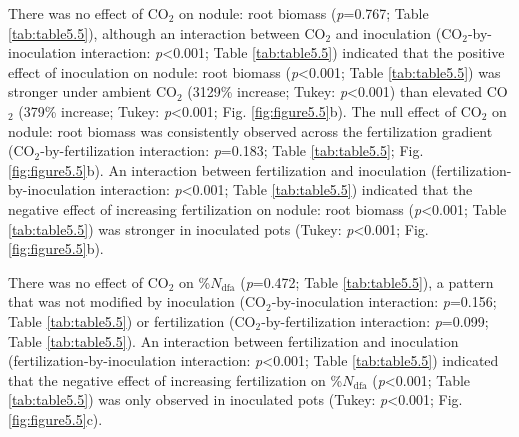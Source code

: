 There was no effect of CO$_2$ on nodule: root biomass (\textit{p}=0.767; Table \ref{tab:table5.5}), although an interaction between CO$_2$ and inoculation (CO$_2$-by-inoculation interaction: \textit{p}<0.001; Table \ref{tab:table5.5}) indicated that the positive effect of inoculation on nodule: root biomass (\textit{p}<0.001; Table \ref{tab:table5.5}) was stronger under ambient CO$_2$ (3129\% increase; Tukey: \textit{p}<0.001) than elevated CO$_2$ (379\% increase; Tukey: \textit{p}<0.001; Fig. \ref{fig:figure5.5}b). The null effect of CO$_2$ on nodule: root biomass was consistently observed across the fertilization gradient (CO$_2$-by-fertilization interaction: \textit{p}=0.183; Table \ref{tab:table5.5}; Fig. \ref{fig:figure5.5}b). An interaction between fertilization and inoculation (fertilization-by-inoculation interaction: \textit{p}<0.001; Table \ref{tab:table5.5}) indicated that the negative effect of increasing fertilization on nodule: root biomass (\textit{p}<0.001; Table \ref{tab:table5.5}) was stronger in inoculated pots (Tukey: \textit{p}<0.001; Fig. \ref{fig:figure5.5}b). 

There was no effect of CO$_2$ on \%$N_\mathrm{dfa}$ (\textit{p}=0.472; Table \ref{tab:table5.5}), a pattern that was not modified by inoculation (CO$_2$-by-inoculation interaction: \textit{p}=0.156; Table \ref{tab:table5.5}) or fertilization (CO$_2$-by-fertilization interaction: \textit{p}=0.099; Table \ref{tab:table5.5}). An interaction between fertilization and inoculation (fertilization-by-inoculation interaction: \textit{p}<0.001; Table \ref{tab:table5.5}) indicated that the negative effect of increasing fertilization on \%$N_\mathrm{dfa}$ (\textit{p}<0.001; Table \ref{tab:table5.5}) was only observed in inoculated pots (Tukey: \textit{p}<0.001; Fig. \ref{fig:figure5.5}c).

